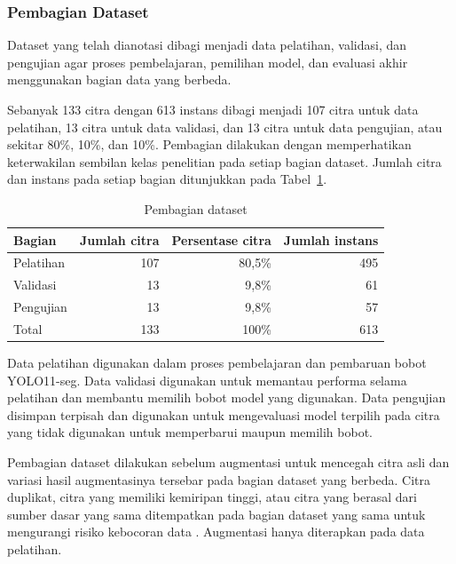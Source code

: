 \subsubsection{Pembagian Dataset}

Dataset yang telah dianotasi dibagi menjadi data pelatihan, validasi, dan pengujian agar proses pembelajaran, pemilihan model, dan evaluasi akhir menggunakan bagian data yang berbeda.

Sebanyak 133 citra dengan 613 instans dibagi menjadi 107 citra untuk data pelatihan, 13 citra untuk data validasi, dan 13 citra untuk data pengujian, atau sekitar 80\%, 10\%, dan 10\%. Pembagian dilakukan dengan memperhatikan keterwakilan sembilan kelas penelitian pada setiap bagian dataset. Jumlah citra dan instans pada setiap bagian ditunjukkan pada Tabel~\ref{tab:pembagian-dataset}.

\begin{table}[H]
    \centering
    \caption{Pembagian dataset}
    \label{tab:pembagian-dataset}
    \begin{tabular}{lrrr}
        \hline
        Bagian & Jumlah citra & Persentase citra & Jumlah instans \\
        \hline
        Pelatihan & 107 & 80,5\% & 495 \\
        Validasi & 13 & 9,8\% & 61 \\
        Pengujian & 13 & 9,8\% & 57 \\
        \hline
        Total & 133 & 100\% & 613 \\
        \hline
    \end{tabular}
\end{table}

Data pelatihan digunakan dalam proses pembelajaran dan pembaruan bobot YOLO11-seg. Data validasi digunakan untuk memantau performa selama pelatihan dan membantu memilih bobot model yang digunakan. Data pengujian disimpan terpisah dan digunakan untuk mengevaluasi model terpilih pada citra yang tidak digunakan untuk memperbarui maupun memilih bobot.

Pembagian dataset dilakukan sebelum augmentasi untuk mencegah citra asli dan variasi hasil augmentasinya tersebar pada bagian dataset yang berbeda. Citra duplikat, citra yang memiliki kemiripan tinggi, atau citra yang berasal dari sumber dasar yang sama ditempatkan pada bagian dataset yang sama untuk mengurangi risiko kebocoran data \cite{tampu2022}. Augmentasi hanya diterapkan pada data pelatihan.
